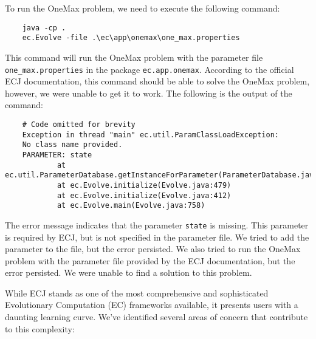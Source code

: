   To run the OneMax problem, we need to execute the following command:

  \begin{verbatim}
    java -cp .
    ec.Evolve -file .\ec\app\onemax\one_max.properties  
  \end{verbatim}

  This command will run the OneMax problem with the parameter file \texttt{one\_max.properties} in the package \texttt{ec.app.onemax}.
  According to the official ECJ documentation, this command should be able to solve the OneMax problem, however, we were unable to get it to work.
  The following is the output of the command:

  \begin{verbatim}
    # Code omitted for brevity
    Exception in thread "main" ec.util.ParamClassLoadException:
    No class name provided.
    PARAMETER: state
            at ec.util.ParameterDatabase.getInstanceForParameter(ParameterDatabase.java:493)
            at ec.Evolve.initialize(Evolve.java:479)
            at ec.Evolve.initialize(Evolve.java:412)
            at ec.Evolve.main(Evolve.java:758)
  \end{verbatim}

  The error message indicates that the parameter \texttt{state} is missing.
  This parameter is required by ECJ, but is not specified in the parameter file.
  We tried to add the parameter to the file, but the error persisted.
  We also tried to run the OneMax problem with the parameter file provided by the ECJ documentation, but the error persisted.
  We were unable to find a solution to this problem.

  While ECJ stands as one of the most comprehensive and sophisticated Evolutionary Computation (EC) frameworks available, it presents users with a daunting learning curve.
  We've identified several areas of concern that contribute to this complexity:

